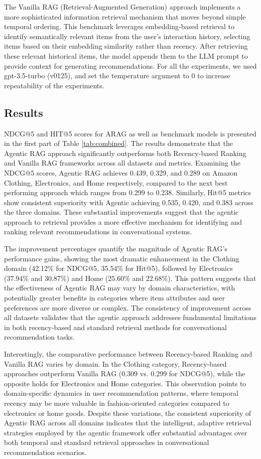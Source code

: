 \documentclass[sigconf]{acmart}
\begin{document}
The Vanilla RAG (Retrieval-Augmented Generation) approach implements a more sophisticated information retrieval mechanism that moves beyond simple temporal ordering. This benchmark leverages embedding-based retrieval to identify semantically relevant items from the user's interaction history, selecting items based on their embedding similarity rather than recency. After retrieving these relevant historical items, the model appends them to the LLM prompt to provide context for generating recommendations. For all the experiments, we used gpt-3.5-turbo (v0125), and set the temperature argument to $0$ to increase repeatability of the experiments.  


\subsection{Results}
NDCG@5 and HIT@5 scores for ARAG as well as benchmark models is presented in the first part of Table \ref{tab:combined}. The results demonstrate that the Agentic RAG approach significantly outperforms both Recency-based Ranking and Vanilla RAG frameworks across all datasets and metrics. Examining the NDCG@5 scores, Agentic RAG achieves 0.439, 0.329, and 0.289 on Amazon Clothing, Electronics, and Home respectively, compared to the next best performing approach which ranges from 0.299 to 0.238. Similarly, Hit@5 metrics show consistent superiority with Agentic achieving 0.535, 0.420, and 0.383 across the three domains. These substantial improvements suggest that the agentic approach to retrieval provides a more effective mechanism for identifying and ranking relevant recommendations in conversational systems.


The improvement percentages quantify the magnitude of Agentic RAG's performance gains, showing the most dramatic enhancement in the Clothing domain (42.12\% for NDCG@5, 35.54\% for Hit@5), followed by Electronics (37.94\% and 30.87\%) and Home (25.60\% and 22.68\%). This pattern suggests that the effectiveness of Agentic RAG may vary by domain characteristics, with potentially greater benefits in categories where item attributes and user preferences are more diverse or complex. The consistency of improvement across all datasets validates that the agentic approach addresses fundamental limitations in both recency-based and standard retrieval methods for conversational recommendation tasks.


Interestingly, the comparative performance between Recency-based Ranking and Vanilla RAG varies by domain. In the Clothing category, Recency-based approaches outperform Vanilla RAG (0.309 vs. 0.299 for NDCG@5), while the opposite holds for Electronics and Home categories. This observation points to domain-specific dynamics in user recommendation patterns, where temporal recency may be more valuable in fashion-oriented categories compared to electronics or home goods. Despite these variations, the consistent superiority of Agentic RAG across all domains indicates that the intelligent, adaptive retrieval strategies employed by the agentic framework offer substantial advantages over both temporal and standard retrieval approaches in conversational recommendation scenarios.
\end{document}
